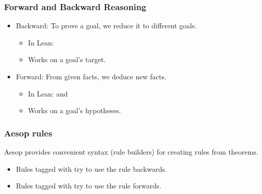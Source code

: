 \begin{frame}
  \frametitle{Forward and Backward Reasoning}

  \begin{itemize}
    \item Backward:
    To prove a goal, we reduce it to different goals.
    \begin{itemize}
      \item In Lean: 
      \item Works on a goal's target.
    \end{itemize}

    \item Forward:
    From given facts, we deduce new facts.
    \begin{itemize}
      \item In Lean:  and 
      \item Works on a goal's hypotheses.
    \end{itemize}
  \end{itemize}
\end{frame}

%


%

\begin{frame}
  \frametitle{Aesop rules}

  Aesop provides convenient syntax (rule builders) for
  creating rules from theorems.

  \pause

  \begin{itemize}
    \item Rules tagged with  try to use the rule backwards.
    \item Rules tagged with  try to use the rule forwards.
  \end{itemize}
\end{frame}

